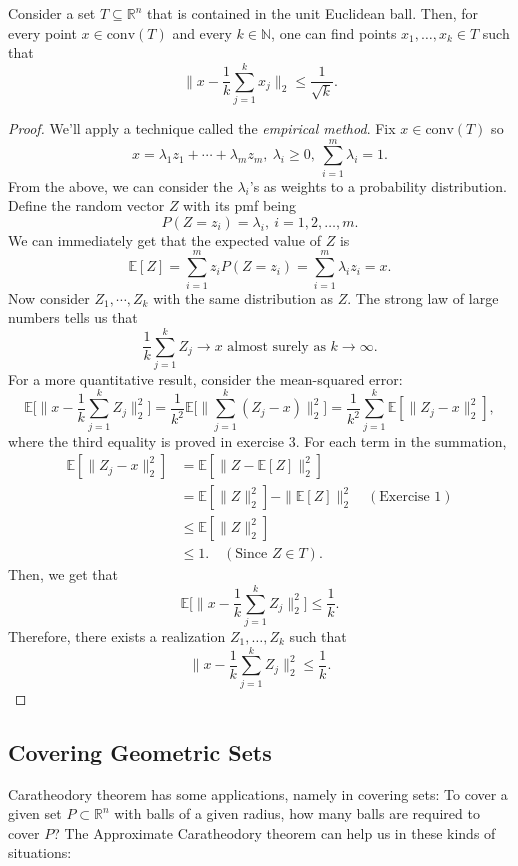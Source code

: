 \begin{theorem}
\label{thm:0.0.2}
Consider a set $T \subseteq \mathbb{R}^n$ that is contained in the unit Euclidean ball. Then, for every point 
$x \in \text{conv}(T)$ and every $k \in \mathbb{N}$, one can find points $x_1, \dots, x_k \in T$ such that 
\[ \bigg\| x - \frac{1}{k} \sum_{j = 1}^{k} x_j \bigg\|_2 \leq \frac{1}{\sqrt{k}}. \]
\end{theorem}

\begin{proof}
We'll apply a technique called the \textit{empirical method}. Fix $x \in \text{conv}(T)$ so 
\[ x = \lambda_1 z_1 + \cdots + \lambda_m z_m, \ \lambda_i \geq 0, \ \sum_{i = 1}^{m} \lambda_i = 1. \]
From the above, we can consider the $\lambda_i$'s as weights to a probability distribution. Define the random 
vector $Z$ with its pmf being 
\[ P(Z = z_i) = \lambda_i, \ i = 1, 2, \dots, m. \]
We can immediately get that the expected value of $Z$ is 
\[ \mathbb{E}[Z] = \sum_{i = 1}^{m} z_i P(Z = z_i) = \sum_{i = 1}^{m} \lambda_i z_i = x. \]
Now consider $Z_1, \cdots, Z_k$ with the same distribution as $Z$. The strong law of large numbers tells us that 
\[ \frac{1}{k}\sum_{j = 1}^{k} Z_j \to x \text{  almost surely as  } k \to \infty. \]
For a more quantitative result, consider the mean-squared error:
\[ \mathbb{E}\biggl[ \bigg\| x - \frac{1}{k}\sum_{j = 1}^{k}Z_j \bigg\|_2^2 \biggr] 
= \frac{1}{k^2} \mathbb{E}\biggl[ \bigg\| \sum_{j = 1}^{k} (Z_j - x) \bigg\|_2^2 \biggr] 
= \frac{1}{k^2} \sum_{j = 1}^{k} \mathbb{E}[\| Z_j - x \|_2^2], \]
where the third equality is proved in exercise 3. For each term in the summation, 
\begin{align*}
	\mathbb{E}[\|Z_j - x\|_2^2] 
	&= \mathbb{E}[\|Z - \mathbb{E}[Z]\|_2^2] \\
	&= \mathbb{E}[\|Z\|_2^2] - \|\mathbb{E}[Z]\|_2^2 \quad (\text{Exercise 1}) \\
	&\leq \mathbb{E}[\|Z\|_2^2] \\
	&\leq 1. \quad (\text{Since } Z \in T).
\end{align*}
Then, we get that 
\[ \mathbb{E}\biggl[ \bigg\| x - \frac{1}{k}\sum_{j = 1}^{k}Z_j \bigg\|_2^2 \biggr] \leq \frac{1}{k}. \]
Therefore, there exists a realization $Z_1, \dots, Z_k$ such that 
\[ \bigg\| x - \frac{1}{k}\sum_{j = 1}^{k}Z_j \bigg\|_2^2 \leq \frac{1}{k}. \]
\end{proof}


\subsection{Covering Geometric Sets}
Caratheodory theorem has some applications, namely in covering sets: To cover a given set $P \subset 
\mathbb{R}^n$ with balls of a given radius, how many balls are required to cover $P$? The Approximate 
Caratheodory theorem can help us in these kinds of situations: 

